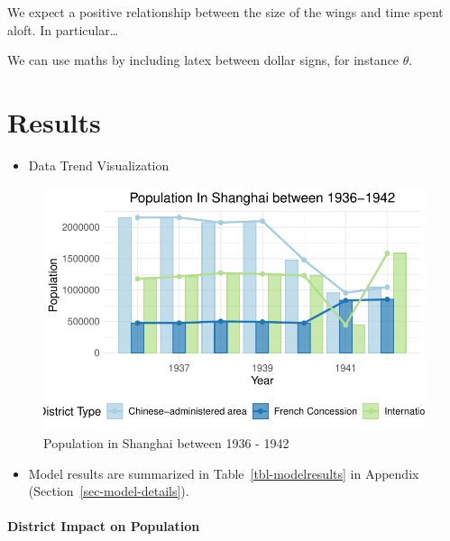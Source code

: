 \documentclass[
  letterpaper,
  DIV=11,
  numbers=noendperiod]{scrartcl}
\let\oldparagraph\paragraph
\renewcommand{\paragraph}[1]{\oldparagraph{#1}\mbox{}}
\providecommand{\tightlist}{%
  \setlength{\itemsep}{0pt}\setlength{\parskip}{0pt}}\usepackage{longtable,booktabs,array}
\begin{document}
We expect a positive relationship between the size of the wings and time
spent aloft. In particular\ldots{}

We can use maths by including latex between dollar signs, for instance
\(\theta\).

\hypertarget{results}{%
\section{Results}\label{results}}

\begin{itemize}
\tightlist
\item
  Data Trend Visualization
\end{itemize}

\begin{figure}

{\centering \includegraphics{paper_files/figure-pdf/fig-pop-1.pdf}

}

\caption{\label{fig-pop}Population in Shanghai between 1936 - 1942}

\end{figure}

\begin{itemize}
\tightlist
\item
  Model results are summarized in Table~\ref{tbl-modelresults} in
  Appendix (Section~\ref{sec-model-details}).
\end{itemize}

\hypertarget{district-impact-on-population}{%
\paragraph{District Impact on
Population}\label{district-impact-on-population}}
\end{document}

